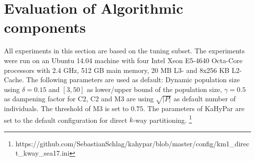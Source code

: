 \documentclass[a4paper,12pt,titlepage, BCOR7mm,headsepline]{scrbook}
\numberwithin{equation}{section}
\begin{document}
\section{Evaluation of Algorithmic components} 
All experiments in this section are based on the tuning subset. The experiments were run on an Ubuntu 14.04 machine with four Intel Xeon E5-4640 Octa-Core processors  with 2.4 GHz, 512 GB main memory, 20 MB L3- and 8x256 KB L2-Cache. The following parameters are used as default: Dynamic population size using $\delta = 0.15$ and $[3,50]$ as lower/upper bound of the population size, $\gamma = 0.5$ as dampening factor for C2, C2 and M3 are using $\sqrt{|P|}$ as default number of individuals. The threshold of M3 is set to $0.75$. The parameters of KaHyPar are set to the default configuration for direct $k$-way partitioning. \footnote{https://github.com/SebastianSchlag/kahypar/blob/master/config/km1\_direct\_kway\_sea17.ini}
\end{document}
